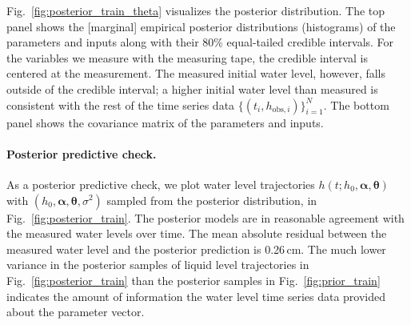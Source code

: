 \documentclass[openacc]{rsproca_new}%
\newcommand\thedata {$\{(t_i,h_{\text{obs}, i})\}_{i=1}^{N}$\xspace}
\newcommand\themodel {$h(t; h_0, \boldsymbol \alpha, \boldsymbol\theta)$\xspace}
\newcommand\thevars{h_0, \boldsymbol \alpha, \boldsymbol \theta, \sigma^2}
\begin{document}
Fig.~\ref{fig:posterior_train_theta} visualizes the posterior distribution. 
The top panel shows the [marginal] empirical posterior distributions (histograms) of the parameters and inputs along with their 80\% equal-tailed credible intervals. 
For the variables we measure with the measuring tape, the credible interval is centered at the measurement. 
The measured initial water level, however, falls outside of the credible interval; a higher initial water level than measured is consistent with the rest of the time series data \thedata.
The bottom panel shows the covariance matrix of the parameters and inputs. 


\paragraph{Posterior predictive check.} As a posterior predictive check, we plot water level trajectories \themodel with $(\thevars)$ sampled from the posterior distribution, in Fig.~\ref{fig:posterior_train}. 
The posterior models are in reasonable agreement with the measured water levels over time. The mean absolute residual between the measured water level and the posterior prediction is 0.26\,cm. The much lower variance in the posterior samples of liquid level trajectories in Fig.~\ref{fig:posterior_train} than the posterior samples in Fig.~\ref{fig:prior_train} indicates the amount of information the water level time series data provided about the parameter vector. 
\end{document}

